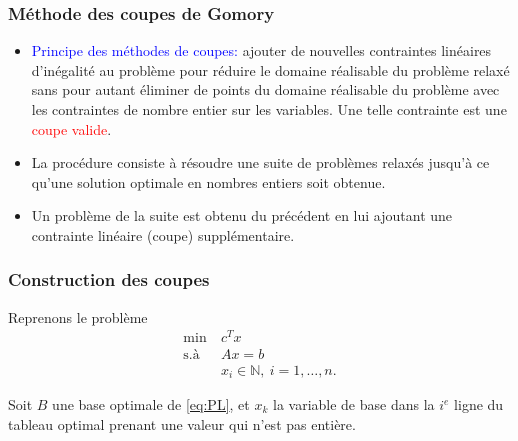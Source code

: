 \documentclass[usepdftitle=false, aspectratio=169]{beamer}
\begin{document}
\begin{frame}
\frametitle{Méthode des coupes de Gomory}

\begin{itemize}
	\item 
\textcolor{blue}{Principe des méthodes de coupes:}
ajouter de nouvelles contraintes linéaires d'inégalité au problème pour
réduire le domaine réalisable du problème relaxé sans pour
autant éliminer de points du domaine réalisable du problème
avec les contraintes de nombre entier sur les variables.
Une telle contrainte est une \textcolor{red}{coupe valide}.
	\item 
La procédure consiste à résoudre une suite de problèmes
relaxés jusqu’à ce qu’une solution optimale en nombres entiers
soit obtenue.
	\item 
Un problème de la suite est obtenu du précédent en lui ajoutant
une contrainte linéaire (coupe) supplémentaire.
\end{itemize}

\end{frame}

\begin{frame}
\frametitle{Construction des coupes}

Reprenons le problème
\begin{equation}
	\begin{aligned}
		\min\ & c^Tx \\
		\mbox{s.à } & Ax = b \\
		& x_i \in \mathbb{N},\ i = 1,\ldots,n.
	\end{aligned}
	\tag{P}
\end{equation}

\mbox{}

Soit $B$ une base optimale de \eqref{eq:PL}, et $x_k$ la variable de base dans la $i^e$ ligne du tableau optimal prenant une valeur qui n'est pas entière.

\end{frame}
\end{document}
